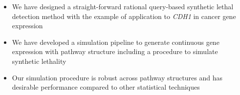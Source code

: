       \begin{itemize}
      \item We have designed a straight-forward rational query-based synthetic lethal detection method with the example of application to \textit{CDH1} in cancer gene expression
      
      \bigskip
      
      \item We have developed a simulation pipeline to generate continuous gene expression with pathway structure including a procedure to simulate synthetic lethality 
      
      \bigskip
      
      \item Our simulation procedure is robust across pathway structures and has desirable performance compared to other statistical techniques 
      \end{itemize}